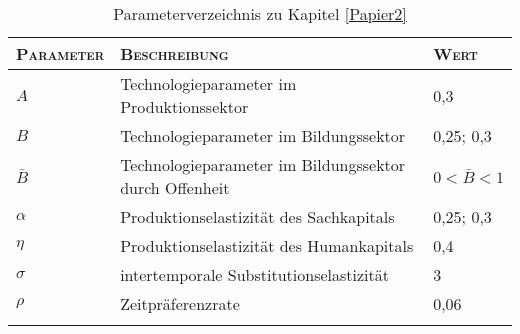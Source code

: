 \begin{center}
	\begin{longtable}{l|l|l} %
		
	\textsc{Parameter} & \textsc{Beschreibung} & \textsc{Wert}\\
	\hline
	\endhead
	
	\endfoot

		$A$ & Technologieparameter im Produktionssektor & 0,3\\
		$B$ & Technologieparameter im Bildungssektor & 0,25; 0,3\\
		$\bar{B}$ &Technologieparameter im Bildungssektor durch Offenheit& $0<\bar{B}<1$\\ 
		$\alpha$ & Produktionselastizit\"at des Sachkapitals & 0,25; 0,3\\
		$\eta$ & Produktionselastizit\"at des Humankapitals & 0,4\\
		$\sigma$ & intertemporale Substitutionselastizit\"at & 3\\
		$\rho$ & Zeitpr\"aferenzrate & 0,06\\
		
	\caption{Parameterverzeichnis zu Kapitel \ref{Papier2}}
	\end{longtable}
\end{center}
